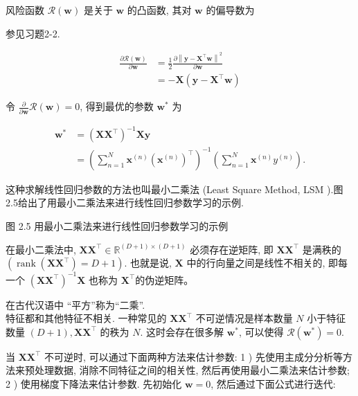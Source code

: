 \documentclass[10pt]{article}
\begin{document}
风险函数 $\mathcal{R}(\boldsymbol{w})$ 是关于 $\boldsymbol{w}$ 的凸函数, 其对 $\boldsymbol{w}$ 的偏导数为

参见习题2-2.


\begin{align*}
\frac{\partial \mathcal{R}(\boldsymbol{w})}{\partial \boldsymbol{w}} & =\frac{1}{2} \frac{\partial\left\|\boldsymbol{y}-\boldsymbol{X}^{\top} \boldsymbol{w}\right\|^{2}}{\partial \boldsymbol{w}}  \tag{2.38}\\
& =-\boldsymbol{X}\left(\boldsymbol{y}-\boldsymbol{X}^{\top} \boldsymbol{w}\right) \tag{2.39}
\end{align*}


令 $\frac{\partial}{\partial \boldsymbol{w}} \mathcal{R}(\boldsymbol{w})=0$, 得到最优的参数 $\boldsymbol{w}^{*}$ 为


\begin{align*}
\boldsymbol{w}^{*} & =\left(\boldsymbol{X} \boldsymbol{X}^{\top}\right)^{-1} \boldsymbol{X} \boldsymbol{y}  \tag{2.40}\\
& =\left(\sum_{n=1}^{N} \boldsymbol{x}^{(n)}\left(\boldsymbol{x}^{(n)}\right)^{\top}\right)^{-1}\left(\sum_{n=1}^{N} \boldsymbol{x}^{(n)} y^{(n)}\right) . \tag{2.41}
\end{align*}


这种求解线性回归参数的方法也叫最小二乘法 (Least Square Method, LSM ).图2.5给出了用最小二乘法来进行线性回归参数学习的示例.



图 2.5 用最小二乘法来进行线性回归参数学习的示例

在最小二乘法中, $\boldsymbol{X} \boldsymbol{X}^{\top} \in \mathbb{R}^{(D+1) \times(D+1)}$ 必须存在逆矩阵, 即 $\boldsymbol{X} \boldsymbol{X}^{\boldsymbol{\top}}$ 是满秩的 $\left(\operatorname{rank}\left(\boldsymbol{X} \boldsymbol{X}^{\top}\right)=D+1\right)$. 也就是说, $\boldsymbol{X}$ 中的行向量之间是线性不相关的, 即每一个 $\left(\boldsymbol{X} \boldsymbol{X}^{\top}\right)^{-1} \boldsymbol{X}$ 也称为 $\boldsymbol{X}^{\top}$的伪逆矩阵。

在古代汉语中 “平方”称为“二乘”.\\
特征都和其他特征不相关. 一种常见的 $\boldsymbol{X} \boldsymbol{X}^{\top}$ 不可逆情况是样本数量 $N$ 小于特征数量 $(D+1), \boldsymbol{X} \boldsymbol{X}^{\top}$ 的秩为 $N$. 这时会存在很多解 $\boldsymbol{w}^{*}$, 可以使得 $\mathcal{R}\left(\boldsymbol{w}^{*}\right)=0$.

当 $\boldsymbol{X} \boldsymbol{X}^{\top}$ 不可逆时, 可以通过下面两种方法来估计参数: 1 ) 先使用主成分分析等方法来预处理数据, 消除不同特征之间的相关性, 然后再使用最小二乘法来估计参数; 2 ) 使用梯度下降法来估计参数. 先初始化 $\boldsymbol{w}=0$, 然后通过下面公式进行迭代:
\end{document}
